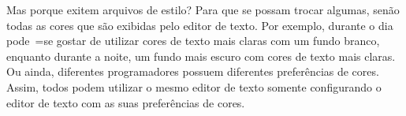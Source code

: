 Mas porque exitem arquivos de estilo?
Para que se possam trocar algumas,
senão todas as cores que são exibidas pelo editor de texto.
Por exemplo,
durante o dia pode~=se gostar de utilizar cores de texto mais claras com um fundo branco,
enquanto durante a noite,
um fundo mais escuro com cores de texto mais claras.
Ou ainda,
diferentes programadores possuem diferentes preferências de cores.
Assim,
todos podem utilizar o mesmo editor de texto somente configurando o editor de texto com as suas preferências de cores.


